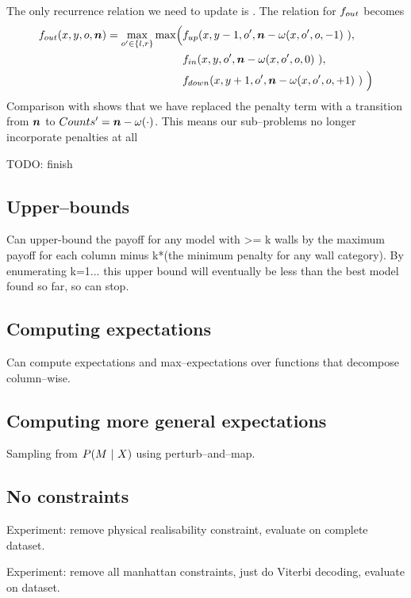 The only recurrence relation we need to update is
. The relation for $\SubProbOUT$ becomes
\begin{equation}
  \begin{split}
    \label{eq:fout-recurrence-aug}
    \SubProbOUT(x,y,\WallOrient,\Counts) = 
    \max_{\WallOrient'\in\{l,r\}} \max \Bigl(
      &\SubProbUP(x,y-1,\WallOrient', 
        \Counts-\CategoryFunc(x,\WallOrient',\WallOrient,-1)~),\\
      &\SubProbIN(x,y,\WallOrient',
        \Counts-\CategoryFunc(x,\WallOrient',\WallOrient,0)~),\\
      &\SubProbDOWN(x,y+1,\WallOrient',
        \Counts-\CategoryFunc(x,\WallOrient',\WallOrient,+1)~)~
    \Bigr)
  \end{split}
\end{equation}
Comparison with  shows that we have replaced
the penalty term with a transition from $\Counts$ to
$Counts'=\Counts-\CategoryFunc(\cdot)$. This means our sub--problems
no longer incorporate penalties at all

TODO: finish

\subsection{Upper--bounds}

Can upper-bound the payoff for any model with >= k walls by the
maximum payoff for each column minus k*(the minimum penalty for any
wall category). By enumerating k=1... this upper bound will eventually
be less than the best model found so far, so can stop.

\subsection{Computing expectations}

Can compute expectations and max--expectations over functions that
decompose column--wise.

\subsection{Computing more general expectations}

Sampling from $P(\Scene ~|~ X)$ using perturb--and--map.

\subsection{No constraints}

Experiment: remove physical realisability constraint, evaluate on
complete dataset.

Experiment: remove all manhattan constraints, just do Viterbi
decoding, evaluate on dataset.
